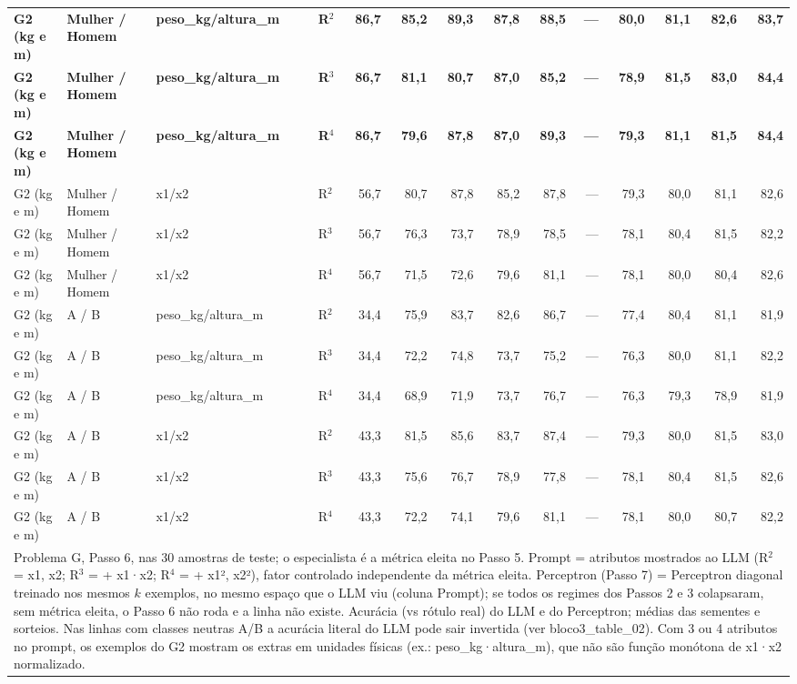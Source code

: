 \begin{table}[htbp]
\begin{tabular}{llllrrrrrrrrrr}
\textbf{G2 (kg e m)} & \textbf{Mulher / Homem} & \textbf{peso\_kg/altura\_m} & \textbf{R$^2$} & \textbf{86,7} & \textbf{85,2} & \textbf{89,3} & \textbf{87,8} & \textbf{88,5} & \textbf{—} & \textbf{80,0} & \textbf{81,1} & \textbf{82,6} & \textbf{83,7} \\
\textbf{G2 (kg e m)} & \textbf{Mulher / Homem} & \textbf{peso\_kg/altura\_m} & \textbf{R$^3$} & \textbf{86,7} & \textbf{81,1} & \textbf{80,7} & \textbf{87,0} & \textbf{85,2} & \textbf{—} & \textbf{78,9} & \textbf{81,5} & \textbf{83,0} & \textbf{84,4} \\
\textbf{G2 (kg e m)} & \textbf{Mulher / Homem} & \textbf{peso\_kg/altura\_m} & \textbf{R$^4$} & \textbf{86,7} & \textbf{79,6} & \textbf{87,8} & \textbf{87,0} & \textbf{89,3} & \textbf{—} & \textbf{79,3} & \textbf{81,1} & \textbf{81,5} & \textbf{84,4} \\
G2 (kg e m) & Mulher / Homem & x1/x2 & R$^2$ & 56,7 & 80,7 & 87,8 & 85,2 & 87,8 & — & 79,3 & 80,0 & 81,1 & 82,6 \\
G2 (kg e m) & Mulher / Homem & x1/x2 & R$^3$ & 56,7 & 76,3 & 73,7 & 78,9 & 78,5 & — & 78,1 & 80,4 & 81,5 & 82,2 \\
G2 (kg e m) & Mulher / Homem & x1/x2 & R$^4$ & 56,7 & 71,5 & 72,6 & 79,6 & 81,1 & — & 78,1 & 80,0 & 80,4 & 82,6 \\
G2 (kg e m) & A / B & peso\_kg/altura\_m & R$^2$ & 34,4 & 75,9 & 83,7 & 82,6 & 86,7 & — & 77,4 & 80,4 & 81,1 & 81,9 \\
G2 (kg e m) & A / B & peso\_kg/altura\_m & R$^3$ & 34,4 & 72,2 & 74,8 & 73,7 & 75,2 & — & 76,3 & 80,0 & 81,1 & 82,2 \\
G2 (kg e m) & A / B & peso\_kg/altura\_m & R$^4$ & 34,4 & 68,9 & 71,9 & 73,7 & 76,7 & — & 76,3 & 79,3 & 78,9 & 81,9 \\
G2 (kg e m) & A / B & x1/x2 & R$^2$ & 43,3 & 81,5 & 85,6 & 83,7 & 87,4 & — & 79,3 & 80,0 & 81,5 & 83,0 \\
G2 (kg e m) & A / B & x1/x2 & R$^3$ & 43,3 & 75,6 & 76,7 & 78,9 & 77,8 & — & 78,1 & 80,4 & 81,5 & 82,6 \\
G2 (kg e m) & A / B & x1/x2 & R$^4$ & 43,3 & 72,2 & 74,1 & 79,6 & 81,1 & — & 78,1 & 80,0 & 80,7 & 82,2 \\
\bottomrule
\multicolumn{14}{p{0.95\linewidth}}{\footnotesize Problema G, Passo 6, nas 30 amostras de teste; o especialista é a métrica eleita no Passo 5. Prompt = atributos mostrados ao LLM (R$^2$ = x1, x2; R$^3$ = + x1·x2; R$^4$ = + x1², x2²), fator controlado independente da métrica eleita. Perceptron (Passo 7) = Perceptron diagonal treinado nos mesmos $k$ exemplos, no mesmo espaço que o LLM viu (coluna Prompt); se todos os regimes dos Passos 2 e 3 colapsaram, sem métrica eleita, o Passo 6 não roda e a linha não existe. Acurácia (vs rótulo real) do LLM e do Perceptron; médias das sementes e sorteios. Nas linhas com classes neutras A/B a acurácia literal do LLM pode sair invertida (ver bloco3\_table\_02). Com 3 ou 4 atributos no prompt, os exemplos do G2 mostram os extras em unidades físicas (ex.: peso\_kg·altura\_m), que não são função monótona de x1·x2 normalizado.} \\
\end{tabular}
\end{table}
